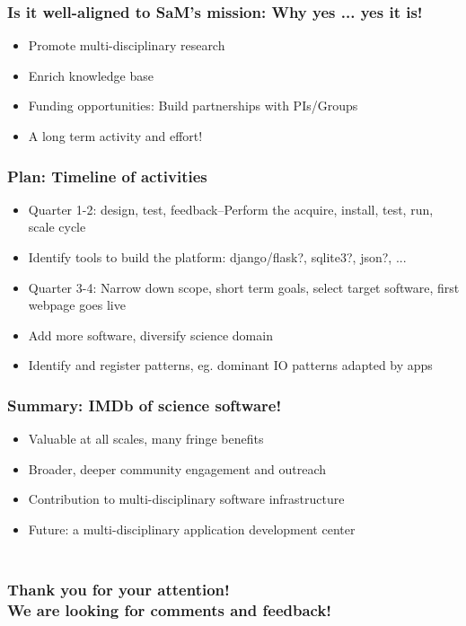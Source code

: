 \documentclass[hyperref={pdfpagelabels=false},12pt]{beamer}
\begin{document}
\begin{frame}
\frametitle{Is it well-aligned to SaM's mission: Why yes ... yes it is!}
\begin{itemize}
\itemsep1em
\item 
Promote multi-disciplinary research
\item
Enrich knowledge base
\item
Funding opportunities: Build partnerships with PIs/Groups
\item
A long term activity and effort!
\end{itemize}
\end{frame}

\begin{frame}
\frametitle{Plan: Timeline of activities }
\begin{itemize}
\itemsep1em
\item Quarter 1-2: design, test, feedback--Perform the acquire, install, test, run, scale cycle
\item Identify tools to build the platform: django/flask?, sqlite3?, json?, ...
\item Quarter 3-4: Narrow down scope, short term goals, select target software, first webpage goes live
\item Add more software, diversify science domain
\item Identify and register patterns, eg. dominant IO patterns adapted by apps
\end{itemize}
\end{frame}

\begin{frame}
\frametitle{Summary: IMDb of science software!}
\begin{itemize}
\itemsep1em
\item Valuable at all scales, many fringe benefits
\item Broader, deeper community engagement and outreach
\item Contribution to multi-disciplinary software infrastructure
\item Future: a multi-disciplinary application development center
\end{itemize}
\end{frame}

\begin{frame}
\frametitle{\\ \centering Thank you for your attention! \\ We are looking for comments and feedback!}
\end{frame}
\end{document}
